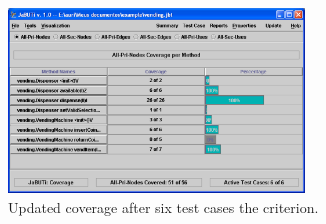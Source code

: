 \begin{figure}[!ht]
\begin{center}
\includegraphics[width=0.70\textwidth]{fig/report-by-method-pri-nodes-tc6.eps}
\caption{\label{fig:summary-method-tc6} Updated coverage after six
test cases \wrt the  criterion.}
\end{center}
\end{figure}
